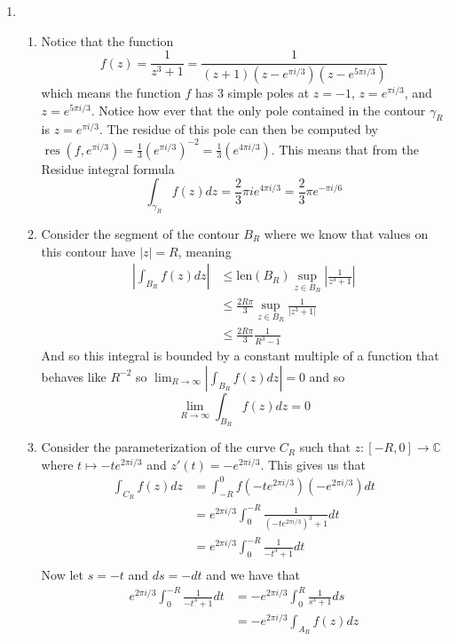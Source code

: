 \documentclass[12pt]{amsart}
\theoremstyle{definition}
\newcommand{\C}{\mathbb{C}}
\DeclareMathOperator{\res}{\mathrm{res}}
\newcommand{\ra}{\rightarrow}
\begin{document}
\begin{enumerate}
\item 
\begin{enumerate}
    \item Notice that the function 
    $$f(z)=\frac{1}{z^3+1}=\frac{1}{(z+1)(z-e^{\pi i /3})(z-e^{5 \pi i /3})}$$
    which means the function $f$ has $3$ simple poles at $z=-1$, $z=e^{\pi i /3}$, and $z=e^{5\pi i /3}$. Notice how ever that the only pole contained in the contour $\gamma_R$ is $z=e^{\pi i /3}$. The residue of this pole can then be computed by $\res(f,e^{\pi i /3})=\frac{1}{3}(e^{\pi i /3})^{-2}=\frac{1}{3}(e^{4\pi i /3})$. This means that from the Residue integral formula 
    $$\int_{\gamma_R}f(z)dz=\frac{2}{3}\pi i e^{4\pi i /3}=\frac{2}{3}\pi e^{-\pi i /6}$$

    \item Consider the segment of the contour $B_R$ where we know that values on this contour have $|z|=R$, meaning \begin{align*}
        \left|\int_{B_R}f(z)dz\right|&\leq \text{len}(B_R)\sup_{z\in B_R}|\frac{1}{z^3+1}|\\
        &\leq \frac{2R\pi}{3}\sup_{z\in B_R}\frac{1}{|z^3+1|}\\
        &\leq \frac{2R\pi}{3}\frac{1}{R^3-1}
    \end{align*}
    And so this integral is bounded by a constant multiple of a function that behaves like $R^{-2}$ so $\lim_{R\ra \infty}\left|\int_{B_R}f(z)dz\right|=0$ and so
    $$\lim_{R\ra \infty}\int_{B_R}f(z)dz=0$$

    \item Consider the parameterization of the curve $C_R$ such that $z:[-R,0]\ra \C$ where $t\mapsto -te^{2\pi i /3}$ and $z'(t)=-e^{2\pi i /3}$. This gives us that
    \begin{align*}
        \int_{C_R}f(z)dz&=\int_{-R}^0 f(-te^{2\pi i /3})(-e^{2\pi i /3})dt\\
        &=e^{2\pi i /3}\int_{0}^{-R} \frac{1}{(-te^{2\pi i /3})^3+1}dt\\
        &=e^{2\pi i /3}\int_{0}^{-R} \frac{1}{-t^3+1}dt\\
    \end{align*}
    Now let $s=-t$ and $ds=-dt$ and we have that
    \begin{align*}
        e^{2\pi i /3}\int_{0}^{-R} \frac{1}{-t^3+1}dt&=-e^{2\pi i /3}\int_{0}^{R} \frac{1}{s^3+1}ds\\
        &=-e^{2\pi i /3}\int_{A_R} f(z)dz\\
    \end{align*}


\end{enumerate}
\end{enumerate}
\end{document}
